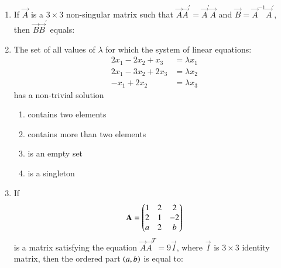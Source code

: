 \documentclass[journal,onecolumn]{IEEEtran}
\theoremstyle{remark}
\begin{document}
\begin{enumerate}
	\item If $\vec{A}$ is a $3\times3$ non-singular matrix such that $\vec{A}\vec{A}^{\prime}=\vec{A}^{\prime}\vec{A}$ and $\vec{B}=\vec{A}^{-1}\vec{A}^{\prime}$, then $\vec{B}\vec{B}^{\prime}$ equals:
	\hfill {}{\par}
	\begin{enumerate}
        \end{enumerate}


    \item The set of all values of $\lambda$ for which the system of linear equations:
	\begin{align*}
		2x_1-2x_2+x_3 &= \lambda x_1\\
		2x_1-3x_2+2x_3 &= \lambda x_2\\
		-x_1+2x_2 &= \lambda x_3
	\end{align*}
	has a non-trivial solution

	\hfill{\brak{JEE M 2015}}
	\begin{enumerate}
		\item contains two elements
		\item contains more than two elements
		\item is an empty set
		\item is a singleton
	\end{enumerate}


	\item If \begin{align*} \mathbf{A} = \begin{pmatrix}1&2&2\\2&1&-2\\a&2&b\end{pmatrix} \end{align*} is a matrix satisfying the equation $\vec{A}\vec{A}^T = 9\vec{I}$, where $\vec{I}$ is $3\times3$ identity matrix, then the ordered part $\left(a,b\right)$ is equal to:
	\hfill {}{\par}
	\begin{enumerate}


\end{enumerate}
\end{enumerate}
\end{document}
